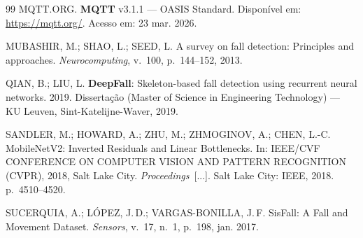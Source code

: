 \documentclass[12pt,a4paper]{article}
\begin{document}
\begin{thebibliography}{99}
MQTT.ORG.
\textbf{MQTT} v3.1.1 — OASIS Standard.
Disponível em: \url{https://mqtt.org/}. Acesso em: 23 mar. 2026.

MUBASHIR, M.; SHAO, L.; SEED, L.
A survey on fall detection: Principles and approaches.
\textit{Neurocomputing}, v.~100, p.~144--152, 2013.

QIAN, B.; LIU, L.
\textbf{DeepFall}: Skeleton-based fall detection using recurrent neural networks.
2019. Dissertação (Master of Science in Engineering Technology) — KU Leuven, Sint-Katelijne-Waver, 2019.

SANDLER, M.; HOWARD, A.; ZHU, M.; ZHMOGINOV, A.; CHEN, L.-C.
MobileNetV2: Inverted Residuals and Linear Bottlenecks.
In: IEEE/CVF CONFERENCE ON COMPUTER VISION AND PATTERN RECOGNITION (CVPR), 2018, Salt Lake City.
\textit{Proceedings}~[...]. Salt Lake City: IEEE, 2018. p.~4510--4520.

SUCERQUIA, A.; LÓPEZ, J.\,D.; VARGAS-BONILLA, J.\,F.
SisFall: A Fall and Movement Dataset.
\textit{Sensors}, v.~17, n.~1, p.~198, jan. 2017.

\end{thebibliography}
\end{document}

